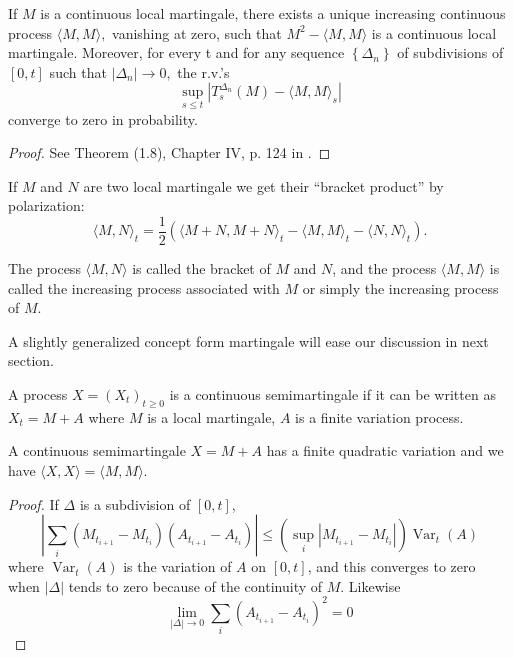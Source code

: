 \begin{theorem}
 	If $M$ is a continuous local martingale, there exists a unique increasing continuous process $\langle M, M\rangle,$ vanishing at zero, such that $M^{2}-\langle M, M\rangle$ is a continuous local martingale. Moreover, for every t and for any sequence $\left\{\Delta_{n}\right\}$ of subdivisions of $[0, t]$ such that $\left|\Delta_{n}\right| \rightarrow 0,$ the r.v.'s \[ \sup _{s \leq t}\left|T_{s}^{\Delta_{n}}(M)-\langle M, M\rangle_{s}\right| \]
 	converge to zero in probability.
 \end{theorem}
\begin{proof}
	See Theorem (1.8), Chapter IV, p. 124 in \cite{revuz2013continuous}.
\end{proof}
	If $M$ and $N$ are two local martingale we get their ``bracket product'' by polarization:
	$$
	\langle M, N\rangle_{t}=\frac{1}{2}\left(\langle M+N, M+N\rangle_{t}-\langle M, M\rangle_{t}-\langle N, N\rangle_{t}\right).
	$$
	\begin{definition}
		The process $\langle M, N\rangle$ is called the bracket of $M$ and $N$, and the process $\langle M, M\rangle$ is called the increasing process associated with $M$ or simply the increasing process of $M .$
	\end{definition}

A slightly generalized concept form martingale will ease our discussion in next section.
	\begin{definition}
		A process $X=\left(X_{t}\right)_{t \geq 0}$ is a continuous semimartingale if it can be written as $X_{t}=M+A$ where $M$ is a local martingale, $A$ is a finite variation process.
	\end{definition}
\begin{proposition}
	A continuous semimartingale $ X = M + A  $ has a finite quadratic
	variation and we have $\langle X, X\rangle=\langle M, M\rangle $.
\end{proposition}
\begin{proof}
If $\Delta$ is a subdivision of $[0, t]$, \[ \left|\sum_{i}\left(M_{t_{i+1}}-M_{t_{i}}\right)\left(A_{t_{i+1}}-A_{t_{i}}\right)\right| \leq\left(\sup _{i}\left|M_{t_{i+1}}-M_{t_{i}}\right|\right) \operatorname{Var}_{t}(A) \] where  $\operatorname{Var}_{t}(A)$ is the variation of $A$ on $[0, t]$, and this converges to zero when $|\Delta|$ tends to zero because of the continuity of $M$. Likewise \[ \lim _{|\Delta| \rightarrow 0} \sum_{i}\left(A_{t_{i+1}}-A_{t_{i}}\right)^{2}=0 \]\end{proof}
